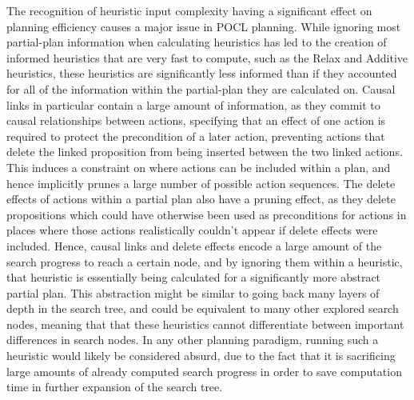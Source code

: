 The recognition of heuristic input complexity having a significant effect on planning efficiency causes a major issue in POCL planning. While ignoring most partial-plan information when calculating heuristics has led to the creation of informed heuristics that are very fast to compute, such as the Relax and Additive heuristics, these heuristics are significantly less informed than if they accounted for all of the information within the partial-plan they are calculated on. Causal links in particular contain a large amount of information, as they commit to causal relationships between actions, specifying that an effect of one action is required to protect the precondition of a later action, preventing actions that delete the linked proposition from being inserted between the two linked actions. This induces a constraint on where actions can be included within a plan, and hence implicitly prunes a large number of possible action sequences. The delete effects of actions within a partial plan also have a pruning effect, as they delete propositions which could have otherwise been used as preconditions for actions in places where those actions realistically couldn't appear if delete effects were included. Hence, causal links and delete effects encode a large amount of the search progress to reach a certain node, and by ignoring them within a heuristic, that heuristic is essentially being calculated for a significantly more abstract partial plan. This abstraction might be similar to going back many layers of depth in the search tree, and could be equivalent to many other explored search nodes, meaning that that these heuristics cannot differentiate between important differences in search nodes. In any other planning paradigm, running such a heuristic would likely be considered absurd, due to the fact that it is sacrificing large amounts of already computed search progress in order to save computation time in further expansion of the search tree.\\


